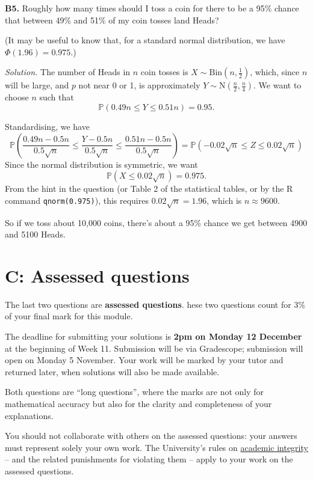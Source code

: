 \documentclass[
  a4paper,
]{book}
\theoremstyle{definition}
\theoremstyle{definition}
\theoremstyle{definition}
\theoremstyle{definition}
\theoremstyle{remark}
\begin{document}
\textbf{B5.} Roughly how many times should I toss a coin for there to be a 95\% chance that between 49\% and 51\% of my coin tosses land Heads?

(It may be useful to know that, for a standard normal distribution, we have \(\Phi(1.96) = 0.975\).)

\begin{myanswers}
\emph{Solution.}
The number of Heads in \(n\) coin tosses is \(X \sim \mathrm{Bin}(n, \frac12)\), which, since \(n\) will be large, and \(p\) not near 0 or 1, is approximately \(Y \sim \mathrm{N}(\frac n2, \frac n4)\). We want to choose \(n\) such that
\[ \mathbb P(0.49 n \leq Y \leq 0.51n) = 0.95 .\]

Standardising, we have
\[ \mathbb P \left( \frac{0.49n - 0.5n}{0.5\sqrt{n}} \leq \frac{Y - 0.5n}{0.5\sqrt{n}} \leq \frac{0.51n - 0.5n}{0.5\sqrt{n}}\right) = \mathbb P(-0.02\sqrt{n} \leq Z \leq 0.02\sqrt{n}) \]
Since the normal distribution is symmetric, we want
\[\mathbb P(X \leq 0.02\sqrt{n}) = 0.975 .\]
From the hint in the question (or Table 2 of the statistical tables, or by the R command \texttt{qnorm(0.975)}), this requires
\(0.02\sqrt{n} = 1.96\), which is \(n \approx 9600\).

So if we toss about 10,000 coins, there's about a 95\% chance we get between 4900 and 5100 Heads.

\end{myanswers}

\hypertarget{P5-assessed}{%
\section*{C: Assessed questions}\label{P5-assessed}}

The last two questions are \textbf{assessed questions}. hese two questions count for 3\% of your final mark for this module.

The deadline for submitting your solutions is \textbf{2pm on Monday 12 December} at the beginning of Week 11. Submission will be via Gradescope; submission will open on Monday 5 November.
Your work will be marked by your tutor and returned later, when solutions will also be made available.

Both questions are ``long questions'', where the marks are not only for mathematical accuracy but also for the clarity and completeness of your explanations.

You should not collaborate with others on the assessed questions: your answers must represent solely your own work. The University's rules on \href{https://library.leeds.ac.uk/info/1401/academic_skills/46/academic_integrity_and_plagiarism}{academic integrity} -- and the related punishments for violating them -- apply to your work on the assessed questions.
\end{document}
